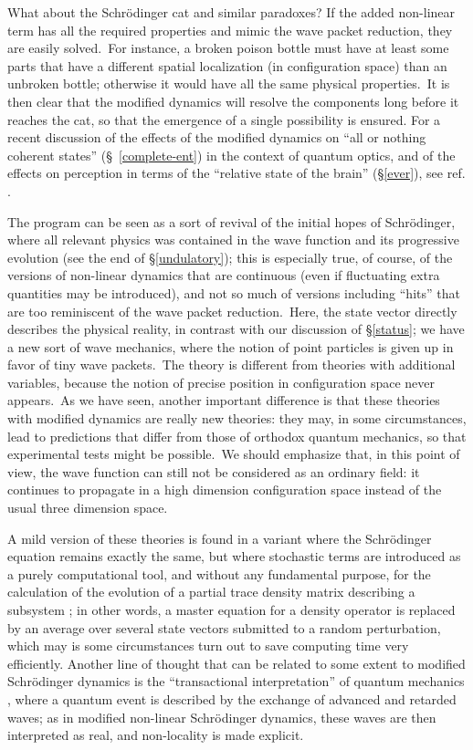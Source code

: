 \documentclass[12pt,onecolumn]{article}%
\begin{document}
What about the Schr\"{o}dinger cat and similar paradoxes? If the added
non-linear term has all the required properties and mimic the wave packet
reduction, they are easily solved.\ For instance, a broken poison bottle must
have at least some parts that have a different spatial localization (in
configuration space) than an unbroken bottle; otherwise it would have all the
same physical properties.\ It is then clear that the modified dynamics will
resolve the components long before it reaches the cat, so that the emergence
of a single possibility is ensured. For a recent discussion of the effects of
the modified dynamics on ``all or nothing coherent states''
(\S \ \ref{complete-ent}) in the context of quantum optics, and of the effects
on perception in terms of the ``relative state of the brain'' (\S \ref{ever}),
see ref. \cite{Ghirardi-2}.

The program can be seen as a sort of revival of the initial hopes of
Schr\"{o}dinger, where all relevant physics was contained in the wave function
and its progressive evolution (see the end of \S \ref{undulatory}); this is
especially true, of course, of the versions of non-linear dynamics that are
continuous (even if fluctuating extra quantities may be introduced), and not
so much of versions including ``hits'' that are too reminiscent of the wave
packet reduction.\ Here, the state vector directly describes the physical
reality, in contrast with our discussion of \S \ref{status}; we have a new
sort of wave mechanics, where the notion of point particles is given up in
favor of tiny wave packets.\ The theory is different from theories with
additional variables, because the notion of precise position in configuration
space never appears.\ As we have seen, another important difference is that
these theories with modified dynamics are really new theories: they may, in
some circumstances, lead to predictions that differ from those of orthodox
quantum mechanics, so that experimental tests might be possible.\ We should
emphasize that, in this point of view, the wave function can still not be
considered as an ordinary field: it continues to propagate in a high dimension
configuration space instead of the usual three dimension space.

A mild version of these theories is found in a variant where the
Schr\"{o}dinger equation remains exactly the same, but where stochastic terms
are introduced as a purely computational tool, and without any fundamental
purpose, for the calculation of the evolution of a partial trace density
matrix describing a subsystem \cite{Gisin2} \cite{Percival} \cite{Knight}; in
other words, a master equation for a density operator is replaced by an
average over several state vectors submitted to a random perturbation, which
may is some circumstances turn out to save computing time very efficiently.
Another line of thought that can be related to some extent to modified
Schr\"{o}dinger dynamics is the ``transactional interpretation'' of quantum
mechanics \cite{transactional}, where a quantum event is described by the
exchange of advanced and retarded waves; as in modified non-linear
Schr\"{o}dinger dynamics, these waves are then interpreted as real, and
non-locality is made explicit.
\end{document}
